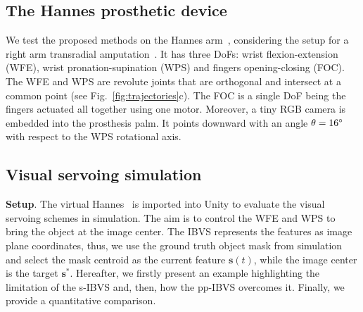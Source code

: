 \subsection{The Hannes prosthetic device}
\label{sec:the_hannes_prosthetic_device}
We test the proposed methods on the Hannes arm~\cite{laffranchi2020hannes}, considering the setup for a right arm transradial amputation~\cite{boccardowrist}. It has three DoFs: wrist flexion-extension (WFE), wrist pronation-supination (WPS) and fingers opening-closing (FOC). The WFE and WPS are revolute joints that are orthogonal and intersect at a common point (see Fig.~\ref{fig:trajectories}c). The FOC is a single DoF being the fingers actuated all together using one motor. Moreover, a tiny RGB camera is embedded into the prosthesis palm. It points downward with an angle $\theta = 16\degree $ with respect to the WPS rotational axis.

\subsection{Visual servoing simulation}
\label{sec:visual_servoing_simulation}

\noindent\textbf{Setup}. The virtual Hannes~\cite{di2021hannes} is imported into Unity to evaluate the visual servoing schemes in simulation. The aim is to control the WFE and WPS to bring the object at the image center. The IBVS represents the features as image plane coordinates, thus, we use the ground truth object mask from simulation and select the mask centroid as the current feature $\mathbf{s}(t)$, while the image center is the target $\mathbf{s}^*$. 
Hereafter, we firstly present an example highlighting the limitation of the s-IBVS and, then, how the pp-IBVS overcomes it. Finally, we provide a quantitative comparison.

